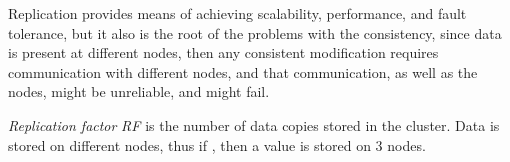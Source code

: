Replication provides means of achieving scalability, performance, and fault tolerance, but it also is the root of the problems with the consistency, since data is present at different nodes, then any consistent modification requires communication with different nodes, and that communication, as well as the nodes, might be unreliable, and might fail. 

\begin{definition}
  \label{def:replicationFactor}
  \emph{Replication factor} \emph{RF} is the number of data copies stored in the cluster. Data is stored on different nodes, thus if , then a value is stored on $3$ nodes.
\end{definition}


